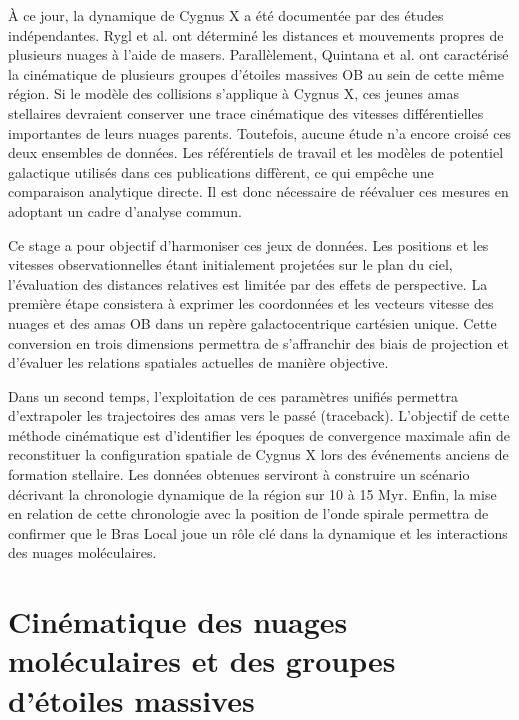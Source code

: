 \documentclass[a4paper, 11pt]{article}
\begin{document}
	À ce jour, la dynamique de Cygnus X a été documentée par des études indépendantes. Rygl et al. \cite{rygl2012} ont déterminé les distances et mouvements propres de plusieurs nuages à l'aide de masers. Parallèlement, Quintana et al. \cite{quintana2021} ont caractérisé la cinématique de plusieurs groupes d’étoiles massives OB au sein de cette même région. Si le modèle des collisions s'applique à Cygnus X, ces jeunes amas stellaires devraient conserver une trace cinématique des vitesses différentielles importantes de leurs nuages parents. Toutefois, aucune étude n'a encore croisé ces deux ensembles de données. Les référentiels de travail et les modèles de potentiel galactique utilisés dans ces publications diffèrent, ce qui empêche une comparaison analytique directe. Il est donc nécessaire de réévaluer ces mesures en adoptant un cadre d'analyse commun.
	
	Ce stage a pour objectif d'harmoniser ces jeux de données. Les positions et les vitesses observationnelles étant initialement projetées sur le plan du ciel, l'évaluation des distances relatives est limitée par des effets de perspective. La première étape consistera à exprimer les coordonnées et les vecteurs vitesse des nuages et des amas OB dans un repère galactocentrique cartésien unique. Cette conversion en trois dimensions permettra de s'affranchir des biais de projection et d'évaluer les relations spatiales actuelles de manière objective.
	
	Dans un second temps, l'exploitation de ces paramètres unifiés permettra d'extrapoler les trajectoires des amas vers le passé (traceback). L'objectif de cette méthode cinématique est d'identifier les époques de convergence maximale afin de reconstituer la configuration spatiale de Cygnus X lors des événements anciens de formation stellaire. Les données obtenues serviront à construire un scénario décrivant la chronologie dynamique de la région sur 10 à 15 Myr. Enfin, la mise en relation de cette chronologie avec la position de l'onde spirale permettra de confirmer que le Bras Local joue un rôle clé dans la dynamique et les interactions des nuages moléculaires.
	
	\setcounter{page}{1}
	\section{Cinématique des nuages moléculaires et des groupes d'étoiles massives}
	
\end{document}
